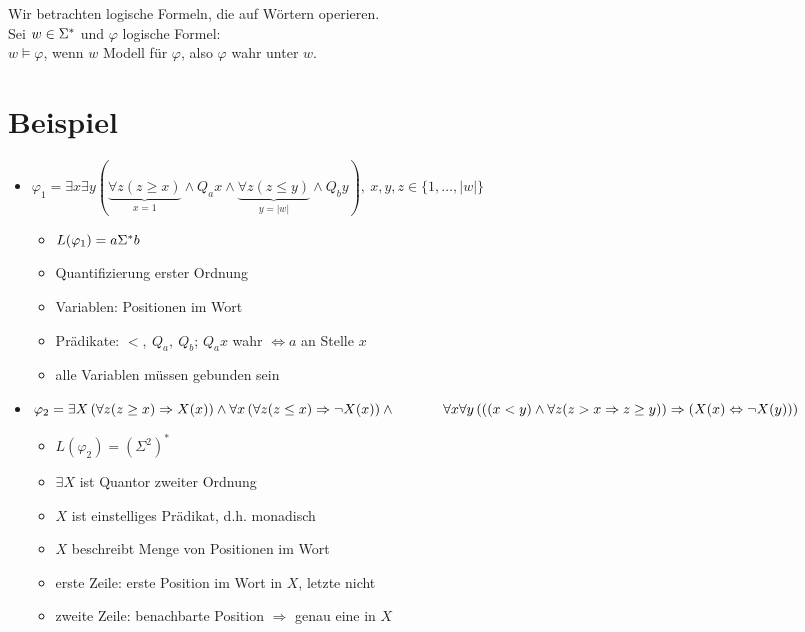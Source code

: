 Wir betrachten logische Formeln, die auf Wörtern operieren.\\
Sei $w\in\Sigma^*$ und $\varphi$ logische Formel:\\
$w\models \varphi$, wenn $w$ Modell für $\varphi$, also $\varphi$ wahr unter $w$.
\section{Beispiel}
    \begin{itemize}
        \item $\varphi_1=\exists x\exists y( \underbrace{\forall z (z\geq x)}_{x=1}\wedge Q_ax\wedge \underbrace{\forall z(z\leq y)}_{y=|w|}\wedge Q_by),\ x,y,z\in\{1,\dots,|w|\}$
        \begin{itemize}
            \item $L(\varphi_1)=a\Sigma^* b$
            \item Quantifizierung erster Ordnung
            \item Variablen: Positionen im Wort
            \item Prädikate: $<,\ Q_a,\ Q_b$; $Q_ax$ wahr $\Leftrightarrow a$ an Stelle $x$
            \item alle Variablen müssen gebunden sein
        \end{itemize}
        \item $\varphi_2=\exists X\left(\forall z(z\geq x)\Rightarrow X(x)\right)\wedge \forall x\left(\forall z(z\leq x)\Rightarrow \neg X(x)\right)\wedge\\\hspace*{1.2cm} \forall x\forall y\left(\left((x<y)\wedge\forall z (z>x\Rightarrow z\geq y)\right)\Rightarrow\left(X(x)\Leftrightarrow \neg X(y)\right)\right)$
        \begin{itemize}
            \item $L(\varphi_2)=\left(\Sigma^2\right)^*$
            \item $\exists X$ ist Quantor zweiter Ordnung
            \item $X$ ist einstelliges Prädikat, d.h. monadisch
            \item $X$ beschreibt Menge von Positionen im Wort
            \item erste Zeile: erste Position im Wort in $X$, letzte nicht
            \item zweite Zeile: benachbarte Position $\Rightarrow$ genau eine in $X$
        \end{itemize}
    \end{itemize}
